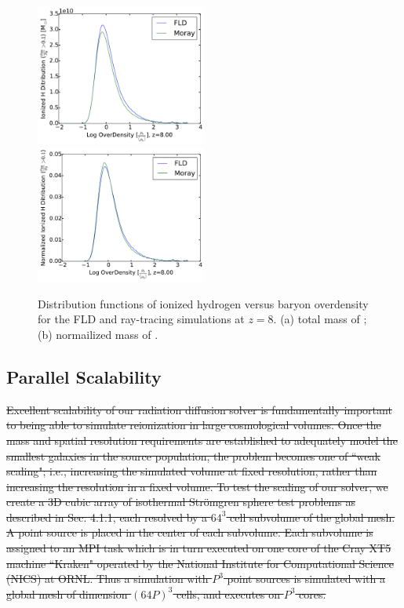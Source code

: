 \begin{figure}[t]
\centerline{\hfill
  \includegraphics[width=0.5\textwidth]{ionized_histogram.pdf}
  \includegraphics[width=0.5\textwidth]{normalized_histogram.pdf}
  \hfill}
  \caption{Distribution functions of ionized hydrogen versus baryon overdensity for the FLD and ray-tracing simulations at $z=8$. (a) total mass of \hii; (b) normailized mass of \hii .}
  \label{fig:ionized_DFs}
\end{figure}


\subsection{Parallel Scalability}
\label{subsec:scalability}


\st{Excellent scalability of our radiation diffusion solver is fundamentally important to being 
able to simulate reionization in large cosmological volumes. Once the 
mass and spatial resolution requirements are established to adequately model the 
smallest galaxies in the source population, the problem becomes one of ``weak
scaling"; i.e., increasing the simulated volume at fixed resolution, rather than increasing
the resolution in a fixed volume. To test the scaling of our solver, we create a 3D cubic array
of isothermal Str\"{o}mgren sphere test problems as described in Sec. 4.1.1, each resolved by a $64^3$ cell subvolume of the global mesh. A point source is placed in the center of each
subvolume.  Each subvolume is assigned to
an MPI task which is in turn executed on one core of the Cray XT5 machine ``Kraken"
operated by the National Institute for Computational Science (NICS) at ORNL. 
Thus a simulation with $P^3$ point sources is simulated with a global
mesh of dimension $(64P)^3$ cells, and executes on $P^3$ cores.}

